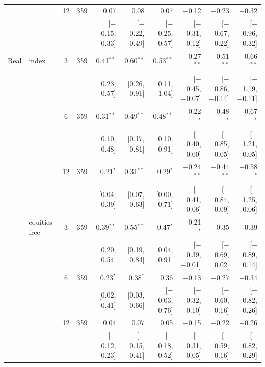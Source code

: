 \begin{longtable}{llcrrrrrrr}
 &  & 12 & 359 & 0.07 & 0.08 & 0.07 & $-$0.12 & $-$0.23 & $-$0.32\\
 & & & & {\scriptsize [$-$0.15, 0.33]} & {\scriptsize [$-$0.22, 0.49]} & {\scriptsize [$-$0.25, 0.57]} & {\scriptsize [$-$0.31, 0.12]} & {\scriptsize [$-$0.67, 0.22]} & {\scriptsize [$-$0.96, 0.32]}\\
\addlinespace
Real & index & 3 & 359 & 0.41$^{**}$ & 0.60$^{**}$ & 0.53$^{**}$ & $-$0.27$^{**}$ & $-$0.51$^{**}$ & $-$0.66$^{**}$\\
 & & & & {\scriptsize [0.23, 0.57]} & {\scriptsize [0.26, 0.91]} & {\scriptsize [0.11, 1.04]} & {\scriptsize [$-$0.45, $-$0.07]} & {\scriptsize [$-$0.86, $-$0.14]} & {\scriptsize [$-$1.19, $-$0.11]}\\
 &  & 6 & 359 & 0.31$^{**}$ & 0.49$^{**}$ & 0.48$^{**}$ & $-$0.22$^{*}$ & $-$0.48$^{*}$ & $-$0.67$^{*}$\\
 & & & & {\scriptsize [0.10, 0.48]} & {\scriptsize [0.17, 0.81]} & {\scriptsize [0.10, 0.91]} & {\scriptsize [$-$0.40, 0.00]} & {\scriptsize [$-$0.85, $-$0.05]} & {\scriptsize [$-$1.21, $-$0.05]}\\
 &  & 12 & 359 & 0.21$^{*}$ & 0.31$^{**}$ & 0.29$^{*}$ & $-$0.24$^{**}$ & $-$0.44$^{**}$ & $-$0.58$^{*}$\\
 & & & & {\scriptsize [0.04, 0.39]} & {\scriptsize [0.07, 0.63]} & {\scriptsize [0.00, 0.71]} & {\scriptsize [$-$0.41, $-$0.06]} & {\scriptsize [$-$0.84, $-$0.09]} & {\scriptsize [$-$1.25, $-$0.06]}\\
 & equities free & 3 & 359 & 0.39$^{**}$ & 0.55$^{**}$ & 0.47$^{*}$ & $-$0.21$^{*}$ & $-$0.35 & $-$0.39\\
 & & & & {\scriptsize [0.20, 0.54]} & {\scriptsize [0.19, 0.84]} & {\scriptsize [0.04, 0.91]} & {\scriptsize [$-$0.39, $-$0.01]} & {\scriptsize [$-$0.69, 0.02]} & {\scriptsize [$-$0.89, 0.14]}\\
 &  & 6 & 359 & 0.23$^{*}$ & 0.38$^{*}$ & 0.36 & $-$0.13 & $-$0.27 & $-$0.34\\
 & & & & {\scriptsize [0.02, 0.41]} & {\scriptsize [0.03, 0.66]} & {\scriptsize [$-$0.03, 0.76]} & {\scriptsize [$-$0.32, 0.10]} & {\scriptsize [$-$0.60, 0.16]} & {\scriptsize [$-$0.82, 0.26]}\\
 &  & 12 & 359 & 0.04 & 0.07 & 0.05 & $-$0.15 & $-$0.22 & $-$0.26\\
 & & & & {\scriptsize [$-$0.12, 0.23]} & {\scriptsize [$-$0.15, 0.41]} & {\scriptsize [$-$0.18, 0.52]} & {\scriptsize [$-$0.31, 0.05]} & {\scriptsize [$-$0.59, 0.16]} & {\scriptsize [$-$0.82, 0.29]}\\

\end{longtable}
